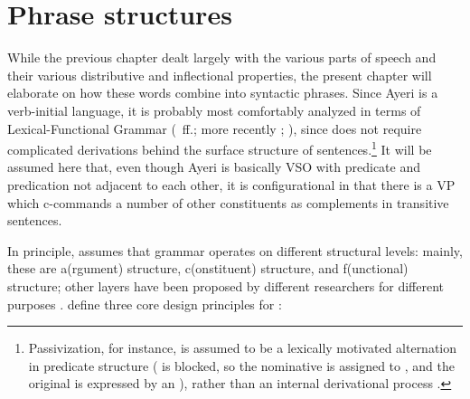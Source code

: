 

\chapter{Phrase structures}
\label{ch:phrasestruct}

While the previous chapter dealt largely with the various parts of speech and
their various distributive and inflectional properties, the present chapter
will elaborate on how these words combine into syntactic phrases. Since Ayeri
is a verb-initial language, it is probably most comfortably analyzed in terms
of Lexical-Functional Grammar (\cite{bresnan1982}~ff.; more recently
\cite{bresnan2016}; \cite{dalrymple2001}), since \Lfg{} does not require
complicated derivations behind the surface structure of
sentences.\footnote{Passivization, for instance, is assumed to be a lexically
motivated alternation in predicate structure (\Sbj{} is blocked, so the
nominative is assigned to \Obj{}, and the original \Sbj{} is expressed  by an
\Adjc{}), rather than an internal derivational process
\citep[23\psqq]{bresnan2016}.} It will be assumed here that, even though Ayeri
is basically VSO with predicate and predication not adjacent to each other, it
is configurational in that there is a VP which c-commands a number of other
constituents as complements in transitive sentences.

In principle, \Lfg{} assumes that grammar operates on different structural 
levels: mainly, these are a(rgument) structure, c(onstituent) structure, and 
f(unctional) structure; other layers have been proposed by different 
researchers for different purposes \citep[862--865]{buttking2015}. 
\citet{bresnan2016} define three core design principles for \Lfg{}:


